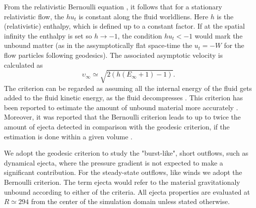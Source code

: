 From the relativistic Bernoulli equation \citep{Rezzolla:2013}, it follows
that for a stationary relativistic flow, the $hu_t$ is constant along the 
fluid worldliens. Here $h$ is the (relativistic) enthalpy, which is
defined up to a constant factor. 
%
If at the spatial infinity the enthalpy is set so $h\rightarrow-1$, 
the condition $hu_t < -1$ would mark the unbound matter 
(as in the assymptotically flat space-time the 
$u_t = -W$ for the flow particles following geodesics).
%
The associated asymptotic velocity is calculated as 
%
\begin{equation}
\upsilon_{\infty} \simeq \sqrt{2 (h (E_{\infty}+1)-1)}. 
\end{equation}
%
The criterion can be regarded as assuming all the internal energy of the fluid 
gets added to the fluid kinetic energy, as the fluid decompresses .
%
%
This criterion has been reported to estimate the amount of unbound material more accurately
\citep{Foucart:2015gaa}. 
Moreover, it was reported that the Bernoulli criterion leads to up to twice 
the amount of ejecta detected in comparison with the geodesic criterion, 
if the estimation is done within a given volume \citep{Kastaun:2014fna}.



We adopt the geodesic criterion to study the "burst-like", short outflows,
such as dynamical ejecta, where the pressure gradient is not expected to make a significant contribution.
For the steady-state outflows, like \pmerg{} winds we adopt the Bernoulli criterion.
%
The term ejecta would refer to the material gravitationaly 
unbound according to either of the criteria.
%
All ejecta properties are evaluated at $R \simeq 294$ from the center of the 
simulation domain unless stated otherwise. 